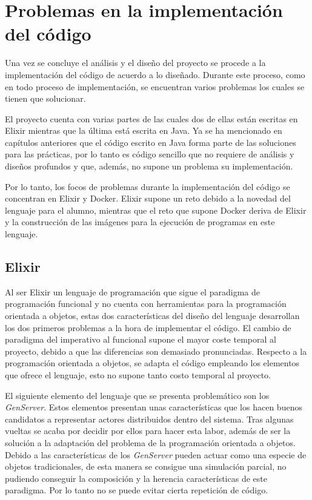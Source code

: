 \section{Problemas en la implementación del código}

Una vez se concluye el análisis y el diseño del proyecto se procede a la implementación del código de acuerdo a lo diseñado. Durante este proceso, como en todo proceso de implementación, se encuentran varios problemas los cuales se tienen que solucionar.

El proyecto cuenta con varias partes de las cuales dos de ellas están escritas en Elixir mientras que la última está escrita en Java. Ya se ha mencionado en capítulos anteriores que el código escrito en Java forma parte de las soluciones para las prácticas, por lo tanto es código sencillo que no requiere de análisis y diseños profundos y que, además, no supone un problema su implementación.

Por lo tanto, los focos de problemas durante la implementación del código se concentran en Elixir y Docker. Elixir supone un reto debido a la novedad del lenguaje para el alumno, mientras que el reto que supone Docker deriva de Elixir y la construcción de las imágenes para la ejecución de programas en este lenguaje.

\subsection{Elixir}

Al ser Elixir un lenguaje de programación que sigue el paradigma de programación funcional y no cuenta con herramientas para la programación orientada a objetos, estas dos características del diseño del lenguaje desarrollan los dos primeros problemas a la hora de implementar el código. El cambio de paradigma del imperativo al funcional supone el mayor coste temporal al proyecto, debido a que las diferencias son demasiado pronunciadas. Respecto a la programación orientada a objetos, se adapta el código empleando los elementos que ofrece el lenguaje, esto no supone tanto costo temporal al proyecto.

El siguiente elemento del lenguaje que se presenta problemático son los \textit{GenServer}. Estos elementos presentan unas características que los hacen buenos candidatos a representar actores distribuidos dentro del sistema. Tras algunas vueltas se acaba por decidir por ellos para hacer esta labor, además de ser la solución a la adaptación del problema de la programación orientada a objetos. Debido a las características de los \textit{GenServer} pueden actuar como una especie de objetos tradicionales, de esta manera se consigue una simulación parcial, no pudiendo conseguir la composición y la herencia características de este paradigma. Por lo tanto no se puede evitar cierta repetición de código.

